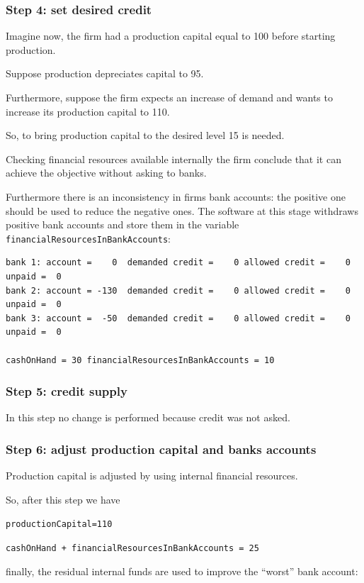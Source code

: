 \documentclass{book}
\begin{document}
	\subsubsection*{Step 4: set desired credit}
	Imagine now, the firm had a production capital equal to 100 before starting production. 
	
	Suppose production depreciates capital to 95.

	Furthermore, suppose the firm expects an increase of demand and wants to increase its production capital to 110.

	So, to bring production capital to the desired level 15 is needed.

	Checking financial resources available internally the firm conclude that it can achieve the objective without asking to banks. 

	Furthermore there is an inconsistency in firms bank accounts: the positive one should be used to reduce the negative ones. The software at this stage withdraws positive bank accounts and store them in the variable \verb+financialResourcesInBankAccounts+:

\begin{verbatim}
bank 1: account =    0  demanded credit =    0 allowed credit =    0 unpaid =  0
bank 2: account = -130  demanded credit =    0 allowed credit =    0 unpaid =  0
bank 3: account =  -50  demanded credit =    0 allowed credit =    0 unpaid =  0

cashOnHand = 30 financialResourcesInBankAccounts = 10
\end{verbatim}

	\subsubsection*{Step 5: credit supply}
In this step no change is performed because credit was not asked.

	\subsubsection*{Step 6: adjust production capital and banks accounts}

	Production capital is adjusted by using internal financial resources. 

	So, after this step we have

	\verb+productionCapital=110+

	\verb/cashOnHand + financialResourcesInBankAccounts = 25/

	finally, the residual internal funds are used to improve the ``worst'' bank account:
\end{document}
